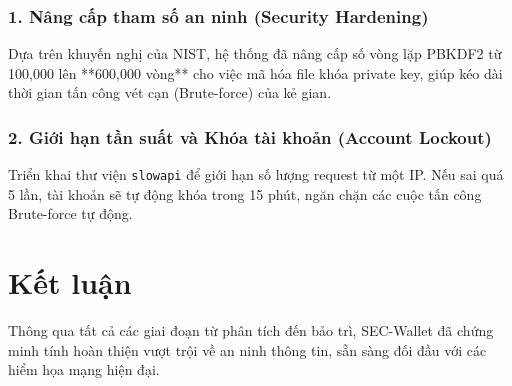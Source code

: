 \documentclass[11pt,a4paper]{article}
\begin{document}
\subsubsection{1. Nâng cấp tham số an ninh (Security Hardening)}
Dựa trên khuyến nghị của NIST, hệ thống đã nâng cấp số vòng lặp PBKDF2 từ 100,000 lên **600,000 vòng** cho việc mã hóa file khóa private key, giúp kéo dài thời gian tấn công vét cạn (Brute-force) của kẻ gian.

\subsubsection{2. Giới hạn tần suất và Khóa tài khoản (Account Lockout)}
Triển khai thư viện \texttt{slowapi} để giới hạn số lượng request từ một IP. Nếu sai quá 5 lần, tài khoản sẽ tự động khóa trong 15 phút, ngăn chặn các cuộc tấn công Brute-force tự động.

\section*{Kết luận}
Thông qua tất cả các giai đoạn từ phân tích đến bảo trì, SEC-Wallet đã chứng minh tính hoàn thiện vượt trội về an ninh thông tin, sẵn sàng đối đầu với các hiểm họa mạng hiện đại.
\end{document}
